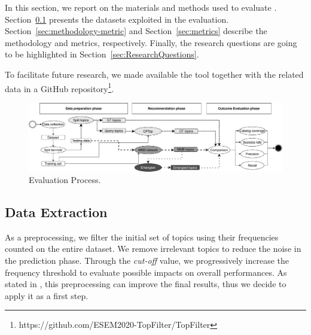 





In this section, we report on the materials and methods used to evaluate \TF. %
Section~\ref{sec:Dataset} presents the datasets exploited in the evaluation. Section~\ref{sec:methodology-metric} and Section~\ref{sec:metrics} describe the methodology and metrics, respectively. Finally, the research questions are going to be highlighted in Section~\ref{sec:ResearchQuestions}.

To facilitate future research, we made available the \TF tool together with the related data in a GitHub repository\footnote{https://github.com/ESEM2020-TopFilter/TopFilter}.


\begin{figure}[h!]
	\centering
	\includegraphics[width=0.9\linewidth,keepaspectratio]{figs/evaluationCF.pdf}
	\caption{Evaluation Process.}
	\label{fig:EvaluationProcess}
	\vspace{-.3cm}
\end{figure}

\subsection{Data Extraction} \label{sec:Dataset}




As a preprocessing, we filter the initial set of topics using their frequencies counted on the entire \GH dataset. We remove irrelevant topics to reduce the noise in the prediction phase. Through the \emph{cut-off} value, we progressively increase the frequency threshold to evaluate possible impacts on overall performances. As stated in \cite{repo-topix}, this preprocessing can improve the final results, thus we decide to apply it as a first step. 

